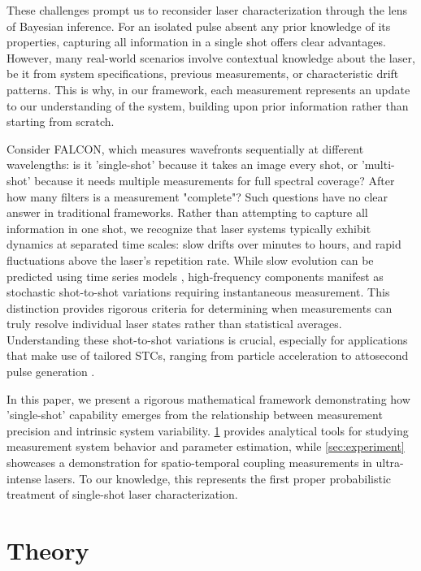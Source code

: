 \documentclass[9pt, twocolumn,superscriptaddress]{revtex4}
\begin{document}
These challenges prompt us to reconsider laser characterization through the lens of Bayesian inference. For an isolated pulse absent any prior knowledge of its properties, capturing all information in a single shot offers clear advantages. However, many real-world scenarios involve contextual knowledge about the laser, be it from system specifications, previous measurements, or characteristic drift patterns. This is why, in our framework, each measurement represents an update to our understanding of the system, building upon prior information rather than starting from scratch. 

Consider FALCON, which measures wavefronts sequentially at different wavelengths: is it 'single-shot' because it takes an image every shot, or 'multi-shot' because it needs multiple measurements for full spectral coverage? After how many filters is a measurement "complete"? Such questions have no clear answer in traditional frameworks. Rather than attempting to capture all information in one shot, we recognize that laser systems typically exhibit dynamics at separated time scales: slow drifts over minutes to hours, and rapid fluctuations above the laser's repetition rate. While slow evolution can be predicted using time series models \cite{dopp2023data}, high-frequency components manifest as stochastic shot-to-shot variations requiring instantaneous measurement. This distinction provides rigorous criteria for determining when measurements can truly resolve individual laser states rather than statistical averages. Understanding these shot-to-shot variations is crucial, especially for applications that make use of tailored STCs, ranging from particle acceleration \cite{debus19,palastro20,caizergues20} to attosecond pulse generation \cite{vincenti12,quere14}.

In this paper, we present a rigorous mathematical framework demonstrating how 'single-shot' capability emerges from the relationship between measurement precision and intrinsic system variability. \cref{sec:theory} provides analytical tools for studying measurement system behavior and parameter estimation, while \cref{sec:experiment} showcases a demonstration for spatio-temporal coupling measurements in ultra-intense lasers. To our knowledge, this represents the first proper probabilistic treatment of single-shot laser characterization.
\section{Theory}\label{sec:theory}
\end{document}
